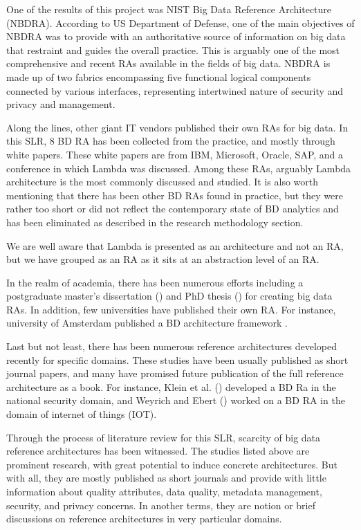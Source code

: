 \documentclass[review]{elsarticle}
\begin{document}
One of the results of this project was NIST Big Data Reference Architecture (NBDRA). According to US Department of Defense, one of the main objectives of NBDRA was to provide with an authoritative source of information on big data that restraint and guides the overall practice. This is arguably one of the most comprehensive and recent RAs available in the fields of big data. NBDRA is made up of two fabrics encompassing five functional logical components connected by various interfaces, representing intertwined nature of security and privacy and management.

Along the lines, other giant IT vendors published their own RAs for big data. In this SLR, 8 BD RA has been collected from the practice, and mostly through white papers. These white papers are from IBM, Microsoft, Oracle, SAP, and a conference in which Lambda was discussed. Among these RAs, arguably Lambda architecture is the most commonly discussed and studied. It is also worth mentioning that there has been other BD RAs found in practice, but they were rather too short or did not reflect the contemporary state of BD analytics and has been eliminated as described in the research methodology section.

We are well aware that Lambda is presented as an architecture and not an RA, but we have grouped as an RA as it sits at an abstraction level of an RA.

In the realm of academia, there has been numerous efforts including a postgraduate master’s dissertation (\cite{Maier}) and PhD thesis (\cite{suthakar2017scalable}) for creating big data RAs. In addition, few universities have published their own RA. For instance, university of Amsterdam published a BD architecture framework \cite{framework2015draft}. 

Last but not least, there has been numerous reference architectures developed recently for specific domains. These studies have been usually published as short journal papers, and many have promised future publication of the full reference architecture as a book. For instance, Klein et al. (\cite{Klein}) developed a BD Ra in the national security domain, and Weyrich and Ebert (\cite{weyrich2015reference}) worked on a BD RA in the domain of internet of things (IOT). 

Through the process of literature review for this SLR, scarcity of big data reference architectures has been witnessed. The studies listed above are prominent research, with great potential to induce concrete architectures. But with all, they are mostly published as short journals and provide with little information about quality attributes, data quality, metadata management, security, and privacy concerns. In another terms, they are notion or brief discussions on reference architectures in very particular domains.
\end{document}
